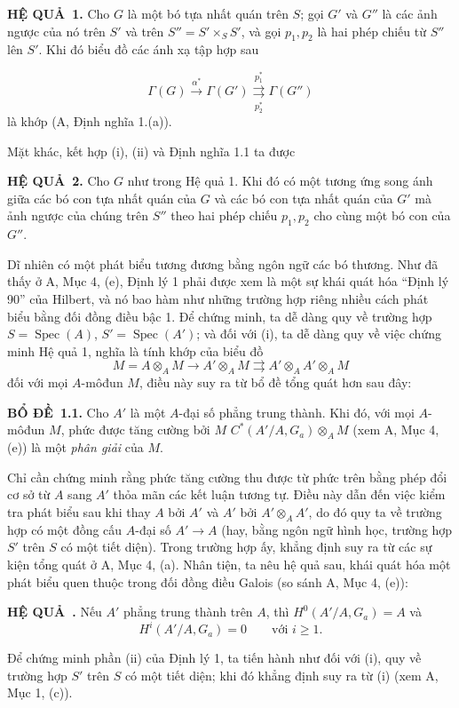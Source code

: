 \documentclass[11pt,twoside,openany]{book}
\numberwithin{equation}{section}
\newcommand{\src}[1]{%
  \phantomsection\hypertarget{src:\fgasourceid:#1}{}%
  \marginpar{\raggedleft\footnotesize\sffamily #1}%
}
\newcommand{\fgasourceid}{unset}
\newcommand{\result}[2]{\par\medskip\noindent\textbf{#1\if\relax\detokenize{#2}\relax\else\ #2\fi.}\quad}
\begin{document}
\result{HỆ QUẢ}{1} Cho $G$ là một bó tựa nhất quán trên $S$; gọi $G'$ và $G''$
là các ảnh ngược của nó trên $S'$ và trên $S''=S'\times_SS'$, và gọi $p_1,p_2$
là hai phép chiếu từ $S''$ lên $S'$. Khi đó biểu đồ các ánh xạ tập hợp sau

\src{316}
\[
  \Gamma(G)\xrightarrow{\alpha^*}\Gamma(G')
  \underset{p_2^*}{\overset{p_1^*}{\rightrightarrows}}\Gamma(G'')
\]
là khớp (A, Định nghĩa 1.(a)).

Mặt khác, kết hợp (i), (ii) và Định nghĩa 1.1 ta được

\result{HỆ QUẢ}{2} Cho $G$ như trong Hệ quả 1. Khi đó có một tương ứng song ánh
giữa các bó con tựa nhất quán của $G$ và các bó con tựa nhất quán của $G'$ mà
ảnh ngược của chúng trên $S''$ theo hai phép chiếu $p_1,p_2$ cho cùng một bó
con của $G''$.

Dĩ nhiên có một phát biểu tương đương bằng ngôn ngữ các bó thương. Như đã thấy
ở A, Mục 4, (e), Định lý 1 phải được xem là một sự khái quát hóa ``Định lý 90''
của Hilbert, và nó bao hàm như những trường hợp riêng nhiều cách phát biểu bằng
đối đồng điều bậc 1. Để chứng minh, ta dễ dàng quy về trường hợp
$S=\operatorname{Spec}(A)$, $S'=\operatorname{Spec}(A')$; và đối với (i), ta
dễ dàng quy về việc chứng minh Hệ quả 1, nghĩa là tính khớp của biểu đồ
\[
  M=A\otimes_A M\longrightarrow A'\otimes_A M
  \rightrightarrows A'\otimes_AA'\otimes_A M
\]
đối với mọi $A$-môđun $M$, điều này suy ra từ bổ đề tổng quát hơn sau đây:

\result{BỔ ĐỀ}{1.1} Cho $A'$ là một $A$-đại số phẳng trung thành. Khi đó, với
mọi $A$-môđun $M$, phức được tăng cường bởi $M$
$C^*(A'/A,G_a)\otimes_A M$ (xem A, Mục 4, (e)) là một \emph{phân giải} của
$M$.

Chỉ cần chứng minh rằng phức tăng cường thu được từ phức trên bằng phép đổi cơ
sở từ $A$ sang $A'$ thỏa mãn các kết luận tương tự. Điều này dẫn đến việc kiểm
tra phát biểu sau khi thay $A$ bởi $A'$ và $A'$ bởi $A'\otimes_AA'$, do đó quy
ta về trường hợp có một đồng cấu $A$-đại số $A'\longrightarrow A$ (hay, bằng
ngôn ngữ hình học, trường hợp $S'$ trên $S$ có một tiết diện). Trong trường hợp
ấy, khẳng định suy ra từ các sự kiện tổng quát ở A, Mục 4, (a). Nhân tiện, ta
nêu hệ quả sau, khái quát hóa một phát biểu quen thuộc trong đối đồng điều
Galois (so sánh A, Mục 4, (e)):

\result{HỆ QUẢ}{} Nếu $A'$ phẳng trung thành trên $A$, thì
$H^0(A'/A,G_a)=A$ và
\[
  H^i(A'/A,G_a)=0\qquad\text{với $i\geq1$}.
\]

Để chứng minh phần (ii) của Định lý 1, ta tiến hành như đối với (i), quy về
trường hợp $S'$ trên $S$ có một tiết diện; khi đó khẳng định suy ra từ (i)
(xem A, Mục 1, (c)).
\end{document}
